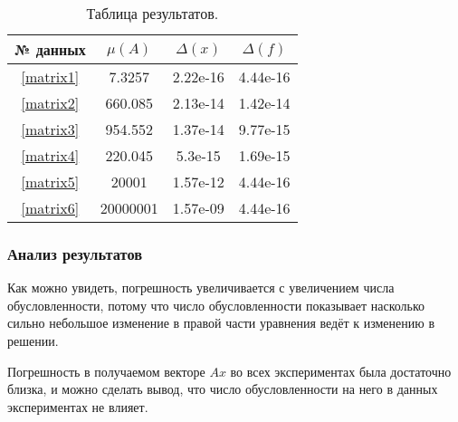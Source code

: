         \begin{table}[H]            
            \begin{center}
                \begin{tabular}{| c | c | c | c |}
                    \hline
                    № данных & $ \mu(A) $ & $ \Delta(x) $ & $ \Delta(f) $ \\ \hline
                    \ref{matrix1} & 7.3257 & 2.22e-16 & 4.44e-16 \\ \hline
                    \ref{matrix2} & 660.085 & 2.13e-14 & 1.42e-14 \\ \hline
                    \ref{matrix3} & 954.552 & 1.37e-14 & 9.77e-15 \\ \hline
                    \ref{matrix4} & 220.045 & 5.3e-15 & 1.69e-15 \\ \hline
                    \ref{matrix5} & 20001 & 1.57e-12 & 4.44e-16 \\ \hline
                    \ref{matrix6} & 20000001 & 1.57e-09 & 4.44e-16 \\ \hline
                \end{tabular}
                \caption{\label{res-tab}Таблица результатов.}
            \end{center}
        \end{table}

        \subsubsection{Анализ результатов}
            Как можно увидеть, погрешность увеличивается с увеличением числа обусловленности, потому что число обусловленности показывает насколько сильно небольшое изменение в правой части уравнения ведёт к изменению в решении.

            Погрешность в получаемом векторе $ Ax $ во всех экспериментах была достаточно близка, и можно сделать вывод, что число обусловленности на него в данных экспериментах не влияет.




